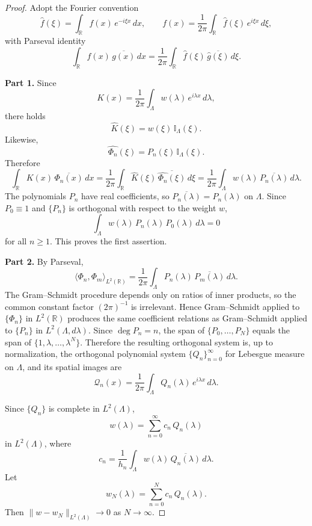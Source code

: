 \documentclass[12pt]{article}
\begin{document}
\begin{proof}
Adopt the Fourier convention
\[
    \hat f(\xi)=\int_{\mathbb{R}} f(x)\,e^{-i\xi x}\,dx,
    \qquad
    f(x)=\frac{1}{2\pi}\int_{\mathbb{R}} \hat f(\xi)\,e^{i\xi x}\,d\xi ,
\]
with Parseval identity
\[
    \int_{\mathbb{R}} f(x)\,\overline{g(x)}\,dx
    =
    \frac{1}{2\pi}\int_{\mathbb{R}} \hat f(\xi)\,\overline{\hat g(\xi)}\,d\xi .
\]

\textbf{Part 1.}
Since
\[
    K(x)=\frac{1}{2\pi}\int_{\Lambda} w(\lambda)\,e^{i\lambda x}\,d\lambda,
\]
there holds
\[
    \hat K(\xi)=w(\xi)\,\mathbb{I}_{\Lambda}(\xi).
\]
Likewise,
\[
    \widehat{\Phi_n}(\xi)=P_n(\xi)\,\mathbb{I}_{\Lambda}(\xi).
\]
Therefore
\[
    \int_{\mathbb{R}} K(x)\,\overline{\Phi_n(x)}\,dx
    =
    \frac{1}{2\pi}\int_{\mathbb{R}} \hat K(\xi)\,\overline{\widehat{\Phi_n}(\xi)}\,d\xi
    =
    \frac{1}{2\pi}\int_{\Lambda} w(\lambda)\,\overline{P_n(\lambda)}\,d\lambda .
\]
The polynomials $P_n$ have real coefficients, so $\overline{P_n(\lambda)}=P_n(\lambda)$ on $\Lambda$. Since $P_0\equiv 1$ and $\{P_n\}$ is orthogonal with respect to the weight $w$,
\[
    \int_{\Lambda} w(\lambda)\,P_n(\lambda)\,P_0(\lambda)\,d\lambda =0
\]
for all $n\ge 1$. This proves the first assertion.

\vspace{1em}
\textbf{Part 2.}
By Parseval,
\[
    \langle \Phi_n,\Phi_m\rangle_{L^2(\mathbb{R})}
    =
    \frac{1}{2\pi}\int_{\Lambda} P_n(\lambda)\,\overline{P_m(\lambda)}\,d\lambda .
\]
The Gram--Schmidt procedure depends only on ratios of inner products, so the common constant factor $(2\pi)^{-1}$ is irrelevant. Hence Gram--Schmidt applied to $\{\Phi_n\}$ in $L^2(\mathbb{R})$ produces the same coefficient relations as Gram--Schmidt applied to $\{P_n\}$ in $L^2(\Lambda,d\lambda)$. Since $\deg P_n=n$, the span of $\{P_0,\dots,P_N\}$ equals the span of $\{1,\lambda,\dots,\lambda^N\}$. Therefore the resulting orthogonal system is, up to normalization, the orthogonal polynomial system $\{Q_n\}_{n=0}^\infty$ for Lebesgue measure on $\Lambda$, and its spatial images are
\[
    \mathcal{Q}_n(x)=\frac{1}{2\pi}\int_{\Lambda} Q_n(\lambda)\,e^{i\lambda x}\,d\lambda .
\]

Since $\{Q_n\}$ is complete in $L^2(\Lambda)$,
\[
    w(\lambda)=\sum_{n=0}^\infty c_n\,Q_n(\lambda)
\]
in $L^2(\Lambda)$, where
\[
    c_n=\frac{1}{h_n}\int_{\Lambda} w(\lambda)\,\overline{Q_n(\lambda)}\,d\lambda .
\]
Let
\[
    w_N(\lambda)=\sum_{n=0}^N c_n\,Q_n(\lambda).
\]
Then $\|w-w_N\|_{L^2(\Lambda)}\to 0$ as $N\to\infty$.


\end{proof}
\end{document}
